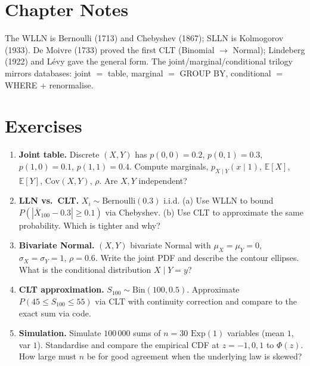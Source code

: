 \section{Chapter Notes}
The WLLN is Bernoulli (1713) and Chebyshev (1867); SLLN is Kolmogorov (1933). De Moivre (1733) proved the first CLT (Binomial $\to$ Normal); Lindeberg (1922) and L\'evy gave the general form. The joint/marginal/conditional trilogy mirrors databases: joint $=$ table, marginal $=$ GROUP BY, conditional $=$ WHERE + renormalise.

\section{Exercises}
\label{sec:ch06-exercises}
\begin{enumerate}[label=E6.\arabic*, leftmargin=*, itemsep=0.8em]
\item \textbf{Joint table.} Discrete $(X,Y)$ has $p(0,0)=0.2$, $p(0,1)=0.3$, $p(1,0)=0.1$, $p(1,1)=0.4$. Compute marginals, $p_{X\mid Y}(x\mid1)$, $\mathbb{E}[X]$, $\mathbb{E}[Y]$, $\mathrm{Cov}(X,Y)$, $\rho$. Are $X,Y$ independent?
\item \textbf{LLN vs.\ CLT.} $X_i\sim\mathrm{Bernoulli}(0.3)$ i.i.d. (a) Use WLLN to bound $P(|\bar X_{100}-0.3|\ge0.1)$ via Chebyshev. (b) Use CLT to approximate the same probability. Which is tighter and why?
\item \textbf{Bivariate Normal.} $(X,Y)$ bivariate Normal with $\mu_X=\mu_Y=0$, $\sigma_X=\sigma_Y=1$, $\rho=0.6$. Write the joint PDF and describe the contour ellipses. What is the conditional distribution $X\mid Y=y$?
\item \textbf{CLT approximation.} $S_{100}\sim\mathrm{Bin}(100,0.5)$. Approximate $P(45\le S_{100}\le55)$ via CLT with continuity correction and compare to the exact sum via code.
\item \textbf{Simulation.} Simulate $100\,000$ sums of $n=30$ $\mathrm{Exp}(1)$ variables (mean $1$, var $1$). Standardise and compare the empirical CDF at $z=-1,0,1$ to $\Phi(z)$. How large must $n$ be for good agreement when the underlying law is skewed?
\end{enumerate}
